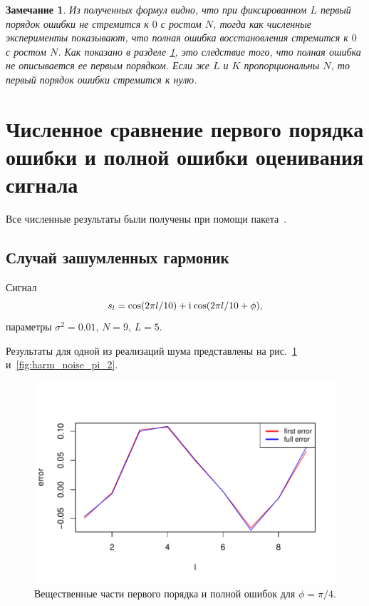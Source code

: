 \documentclass[specialist,
               substylefile = spbu.rtx,
               subf,href,colorlinks=true, 12pt]{disser}
\newtheorem{remark}{Замечание}
\begin{document}
\begin{remark}
	Из полученных формул видно, что при фиксированном $L$ первый порядок ошибки не стремится к $0$ с ростом $N$, тогда как численные эксперименты показывают, что полная ошибка восстановления стремится к $0$ с ростом $N$. Как показано в разделе \ref{sec:results}, это следствие того, что полная ошибка не описывается ее первым порядком. Если же $L$ и $K$ пропорциональны $N$, то первый порядок ошибки стремится к нулю.
\end{remark}


\section{Численное сравнение первого порядка ошибки и полной ошибки оценивания сигнала}
\label{sec:results}

Все численные результаты были получены при помощи пакета~\cite{Korobeynikov.etal2014}.

\subsection{Случай зашумленных гармоник}
Сигнал
$$s_l = \cos(2 \pi l / 10) + \mathrm{i}\mkern1mu\cos(2 \pi l / 10 + \phi),$$
параметры $\sigma^2 = 0.01$, $N = 9$, $L = 5$.

Результаты для одной из реализаций шума представлены на рис.~\ref{fig:harm_noise_pi_4} и~\ref{fig:harm_noise_pi_2}.

\begin{figure}[H]
	\begin{center}
		\includegraphics[width=0.6\linewidth]{img/first_vs_full_re.pdf}
		\caption{Вещественные части первого порядка и полной ошибок для $\phi = \pi / 4$.}
		\label{fig:harm_noise_pi_4}
	\end{center}
\end{figure}
\end{document}
